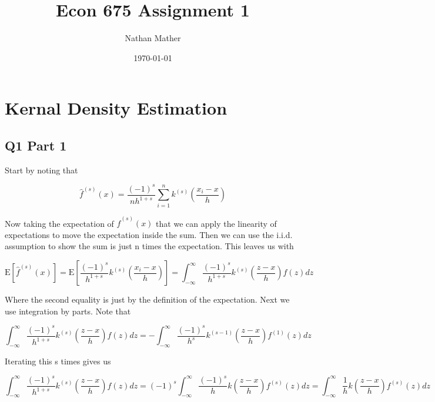 \documentclass[11pt]{article}
\title{Econ 675 Assignment 1} %
\author{Nathan Mather} %
\date{\today} %
\newcommand{\E}{\mathrm{E}}
\begin{document}
	
\maketitle %

\setcounter{tocdepth}{2} %

\tableofcontents %


\section{Kernal Density Estimation}
\subsection{Q1 Part 1}

Start by noting that 

$$ \hat{f}^{(s)}(x) = \frac{(-1)^s}{nh^{1+s}} \sum_{i=1}^{n}k^{(s)} \left( \frac{{x}_i - x}{h} \right) 
$$

Now taking the expectation of $\hat{f}^{(s)}(x)$ that we can apply the linearity of expectations to move the expectation inside the sum. Then we can use the i.i.d. assumption to show the sum is just n times the expectation. This leaves us with 

$$  \E[\hat{f}^{(s)}(x)] = \E \left[ \frac{(-1)^s}{h^{1+s}} k^{(s)} \left( \frac{{x}_i - x}{h} \right)  \right]
= \int_{-\infty}^{\infty} \frac{(-1)^s}{h^{1+s}} k^{(s)} \left( \frac{z - x}{h} \right)f(z)dz
$$



Where the second equality is just by the definition of the expectation. Next we use integration by parts. Note that 

$$\int_{-\infty}^{\infty} \frac{(-1)^s}{h^{1+s}} k^{(s)} \left( \frac{z - x}{h} \right)f(z)dz = -\int_{-\infty}^{\infty} \frac{(-1)^s}{h^{s}} k^{(s-1)} \left( \frac{z - x}{h} \right)f^{(1)}(z)dz
$$

Iterating this s times gives us

$$\int_{-\infty}^{\infty} \frac{(-1)^s}{h^{1+s}} k^{(s)} \left( \frac{z - x}{h} \right)f(z)dz
=  (-1)^s \int_{-\infty}^{\infty} \frac{(-1)^s}{h} k \left( \frac{z - x}{h} \right)f^{(s)}(z)dz
= \int_{-\infty}^{\infty} \frac{1}{h} k \left( \frac{z - x}{h} \right)f^{(s)}(z)dz
$$
\end{document}
